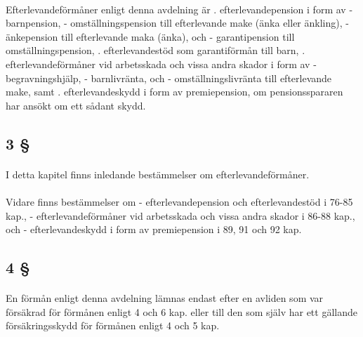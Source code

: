 \documentclass[a4paper,notitlepage,openany,10pt]{book}
\begin{document}
\paragraph*{}
Efterlevandeförmåner enligt denna avdelning är
. efterlevandepension i form av
\newline - barnpension,
\newline - omställningspension till efterlevande make (änka eller änkling),
\newline - änkepension till efterlevande maka (änka), och
\newline - garantipension till omställningspension,
. efterlevandestöd som garantiförmån till barn,
. efterlevandeförmåner vid arbetsskada och vissa andra skador i form av
\newline - begravningshjälp,
\newline - barnlivränta, och
\newline - omställningslivränta till efterlevande make, samt
. efterlevandeskydd i form av premiepension, om pensionsspararen har ansökt om ett sådant skydd.
\subsection*{3 §}
\paragraph*{}
I detta kapitel finns inledande bestämmelser om efterlevandeförmåner.
\paragraph*{}
Vidare finns bestämmelser om
\newline - efterlevandepension och efterlevandestöd i 76-85 kap.,
\newline - efterlevandeförmåner vid arbetsskada och vissa andra skador i 86-88 kap., och
\newline - efterlevandeskydd i form av premiepension i 89, 91 och 92 kap.
\subsection*{4 §}
\paragraph*{}
En förmån enligt denna avdelning lämnas endast efter en avliden som var försäkrad för förmånen enligt 4 och 6 kap.
eller till den som själv har ett gällande försäkringsskydd för förmånen enligt 4 och 5 kap.
\end{document}
